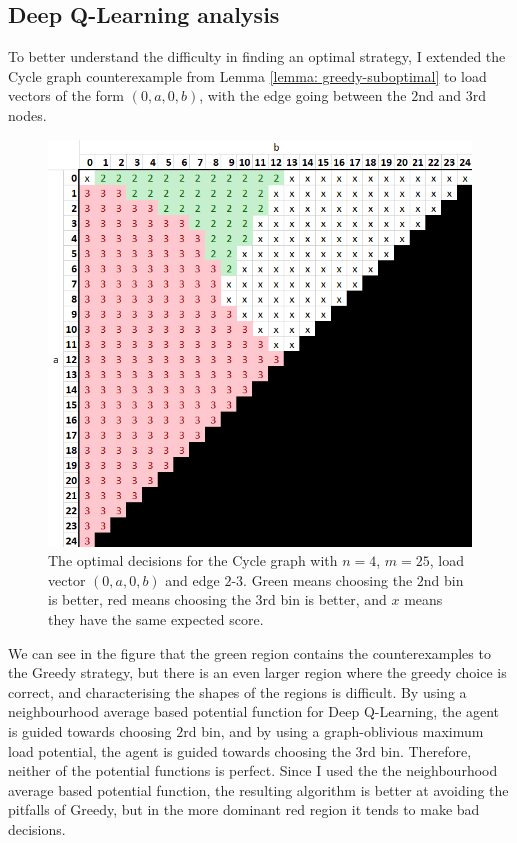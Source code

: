 \subsection{Deep Q-Learning analysis}

To better understand the difficulty in finding an optimal strategy, I extended the Cycle graph counterexample from Lemma \ref{lemma: greedy-suboptimal} to load vectors of the form $(0, a, 0, b)$, with the edge going between the $2$nd and $3$rd nodes. 


\begin{figure}[h!] \label{greedy-counterexample-analysed}
    \centering
    \includegraphics[scale=1.0]{Chapter4/Figs/0a0b_4_25_analysis.png}
    \caption{The optimal decisions for the Cycle graph with $n=4$, $m=25$, load vector $(0,a,0,b)$ and edge $2$-$3$. Green means choosing the $2$nd bin is better, red means choosing the $3$rd bin is better, and $x$ means they have the same expected score.}
\end{figure}


We can see in the figure that the green region contains the counterexamples to the Greedy strategy, but there is an even larger region where the greedy choice is correct, and characterising the shapes of the regions is difficult. By using a neighbourhood average based potential function for Deep Q-Learning, the agent is guided towards choosing $2$rd bin, and by using a graph-oblivious maximum load potential, the agent is guided towards choosing the $3$rd bin. Therefore, neither of the potential functions is perfect. Since I used the the neighbourhood average based potential function, the resulting algorithm is better at avoiding the pitfalls of Greedy, but in the more dominant red region it tends to make bad decisions. 


